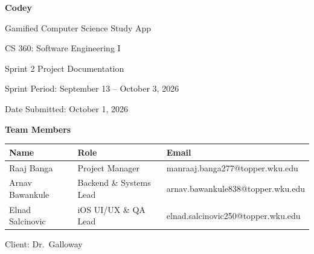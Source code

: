 \documentclass[12pt,letterpaper]{article}
\begin{document}
\begin{titlepage}
\begin{singlespace}
\centering
\vspace*{1.2in}
{\LARGE\bfseries Codey\par}
\vspace{0.25cm}
{\Large Gamified Computer Science Study App\par}
\vspace{1.2cm}
{\large CS 360: Software Engineering I\par}
\vspace{0.3cm}
{\large Sprint 2 Project Documentation\par}
\vspace{0.3cm}
{\large Sprint Period: September 13 -- October 3, 2026\par}
\vspace{0.3cm}
{\large Date Submitted: October 1, 2026\par}
\vspace{1.6cm}
{\large\bfseries Team Members\par}
\vspace{0.4cm}
\begin{tabular}{lll}
\toprule
\textbf{Name} & \textbf{Role} & \textbf{Email} \\
\midrule
Raaj Banga        & Project Manager            & manraaj.banga277@topper.wku.edu \\
Arnav Bawankule   & Backend \& Systems Lead    & arnav.bawankule838@topper.wku.edu \\
Elnad Salcinovic  & iOS UI/UX \& QA Lead       & elnad.salcinovic250@topper.wku.edu \\
\bottomrule
\end{tabular}
\vfill
{\large Client: Dr.\ Galloway\par}
\vspace{0.5in}
\end{singlespace}
\end{titlepage}

\setcounter{page}{2}
\begin{singlespace}
\tableofcontents
\clearpage
\listoffigures
\listoftables
\end{singlespace}
\clearpage
\end{document}

